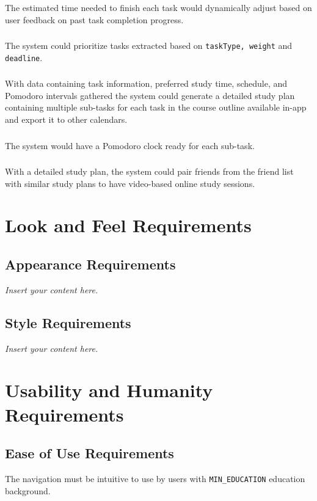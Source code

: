 \documentclass[12pt]{article}
\newcommand{\lips}{\textit{Insert your content here.}}
\begin{document}
\subsubsection{}
The estimated time needed to finish each task would dynamically adjust based on user feedback on past task completion progress.
\subsubsection{}
The system could prioritize tasks extracted based on \texttt{taskType, weight} and \texttt{deadline}.
\subsubsection{}
With data containing task information, preferred study time, schedule, and Pomodoro intervals gathered the system could generate a detailed study plan containing multiple sub-tasks for each task in the course outline available in-app and export it to other calendars.
\subsubsection{}
The system would have a Pomodoro clock ready for each sub-task.
\subsubsection{}
With a detailed study plan, the system could pair friends from the friend list with similar study plans to have video-based online study sessions.
\section{Look and Feel Requirements}
\subsection{Appearance Requirements}
\lips
\subsection{Style Requirements}
\lips

\section{Usability and Humanity Requirements}
\subsection{Ease of Use Requirements}
The navigation must be intuitive to use by users with \texttt{MIN\_EDUCATION} education background.
\end{document}
